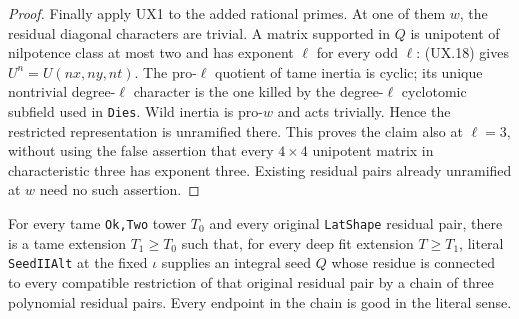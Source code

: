 \begin{proof}
Finally apply UX1 to the added rational primes.  At
one of them $w$, the residual diagonal characters are
trivial.  A matrix supported in $Q$ is unipotent of
nilpotence class at most two and has exponent $\ell$
for every odd $\ell$: (UX.18) gives $U^n=U(nx,ny,nt)$.
The pro-$\ell$ quotient of tame inertia is cyclic;
its unique nontrivial degree-$\ell$ character is the
one killed by the degree-$\ell$ cyclotomic subfield
used in \texttt{Dies}.  Wild inertia is pro-$w$ and
acts trivially.  Hence the restricted representation
is unramified there.  This proves the claim also at
$\ell=3$, without using the false assertion that
every $4\times4$ unipotent matrix in characteristic
three has exponent three.  Existing residual pairs
already unramified at $w$ need no such assertion.
\end{proof}

\begin{proposition}
For every tame \texttt{Ok,Two} tower $T_0$ and every
original \texttt{LatShape} residual pair, there is a
tame extension $T_1\ge T_0$ such that, for every deep
fit extension $T\ge T_1$, literal \texttt{SeedIIAlt}
at the fixed $\iota$ supplies an integral seed $Q$
whose residue is connected to every compatible
restriction of that original residual pair by a
chain of three polynomial residual pairs.  Every
endpoint in the chain is good in the literal sense.
\end{proposition}

